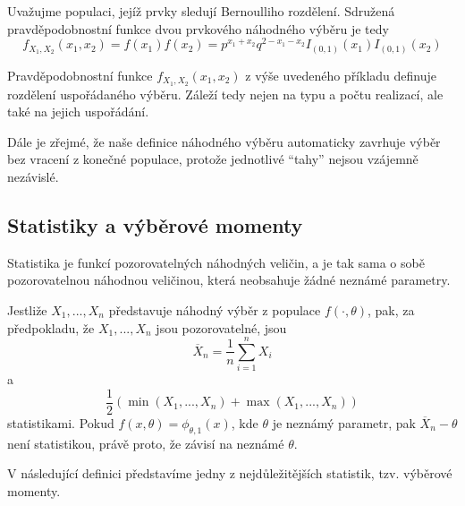 \begin{example}
Uvažujme populaci, jejíž prvky sledují Bernoulliho rozdělení. Sdružená pravděpodobnostní funkce dvou prvkového náhodného výběru je tedy
\begin{equation*}
f_{X_1, X_2}(x_1, x_2) = f(x_1)f(x_2) = p^{x_1 + x_2}q^{2 - x_1 - x_2}I_{(0, 1)}(x_1)I_{(0, 1)}(x_2)
\end{equation*}
\end{example}

Pravděpodobnostní funkce $f_{X_1, X_2}(x_1, x_2)$ z výše uvedeného příkladu definuje rozdělení uspořádaného výběru. Záleží tedy nejen na typu a počtu realizací, ale také na jejich uspořádání.

Dále je zřejmé, že naše definice náhodného výběru automaticky zavrhuje výběr bez vracení z konečné populace, protože jednotlivé ``tahy'' nejsou vzájemně nezávislé.

\subsection{Statistiky a výběrové momenty}

\begin{definition}[Statistika]
Statistika je funkcí pozorovatelných náhodných veličin, a je tak sama o sobě pozorovatelnou náhodnou veličinou, která neobsahuje žádné neznámé parametry. 
\end{definition}

\begin{example}
Jestliže $X_1, ..., X_n$ představuje náhodný výběr z populace $f(\cdot, \theta)$, pak, za předpokladu, že $X_1, ..., X_n$ jsou pozorovatelné, jsou
\begin{equation*}
\overline{X}_n = \frac{1}{n} \sum_{i = 1}^n X_i
\end{equation*}
a
\begin{equation*}
\frac{1}{2}(\min(X_1, ..., X_n) + \max(X_1, ..., X_n))
\end{equation*}
statistikami. Pokud $f(x, \theta) = \phi_{\theta, 1}(x)$, kde $\theta$ je neznámý parametr, pak $\overline{X}_n - \theta$ není statistikou, právě proto, že závisí na neznámé $\theta$. 
\end{example}

V následující definici představíme jedny z  nejdůležitějších statistik, tzv. výběrové momenty.

